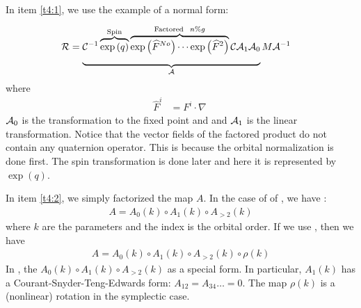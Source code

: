 \documentclass{hitec}     %
\begin{document}
{{{In item \ref{t4:1}, we use the example of a normal form: 
%
\begin{align} {\cal R}&=\underbrace{{{\cal C}}^{-1}\overbrace{\exp\left({q}\right)}\limits_{}^{{\rm S}{\rm p}{\rm i}{\rm n}}\overbrace{\exp\left({{\widehat{F}}^{No}}\right)\cdots\exp\left({{\widehat{F}}^{2}}\right)}\limits_{}^{{\rm F}{\rm a}{\rm c}{\rm t}{\rm o}{\rm r}{\rm e}{\rm d} ~~n\%g}{\cal C}{{\cal A}}_{1}{{\cal A}}_{0}}\limits_{{\cal A}}^{}M{{\cal A}}^{-1} \label{eq:nffact}\end{align}
where
%
\begin{align} {\widehat{F}}^{i}&={F}^{i}\cdot \nabla \ \label{eq:defnor} \end{align}
%
%
 ${\cal A}_{0}$ is the transformation to the fixed point and and ${\cal A}_{1}$ is the linear transformation. Notice that the vector fields of the factored product do not contain any quaternion operator. This is because the orbital normalization is done first. The spin transformation is done later and here it is represented by $\exp(q)$.

In item \ref{t4:2}, we simply factorized the map $A$. In the case of of , we have :
\begin{align} A=
{A}_{0}(k)\circ {A}_{1}(k)\circ {A}_{>2}(k) \label{eq:cfact}\end{align}
where $k$ are the parameters and the index is the orbital order.  
If we use , then we have 
%
\begin{align} A=
{A}_{0}(k)\circ {A}_{1}(k)\circ {A}_{>2}(k)\circ \rho (k) \label{eq:fullc}\end{align}
%
In , the ${A}_{0}(k)\circ {A}_{1}(k)\circ {A}_{>2}(k)$ as a special form. In particular, ${A}_{1}(k)$ has a Courant-Snyder-Teng-Edwards form: $A_{12}=A_{34}\ldots =0$.  The map $\rho (k)$ is 
a (nonlinear) rotation in the symplectic case.


}}}
\end{document}
